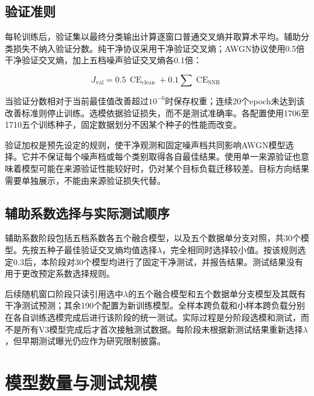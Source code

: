 \documentclass[UTF8,12pt,openany,twoside]{ctexbook}
\numberwithin{equation}{chapter}
\begin{document}
\subsection{验证准则}\label{ux9a8cux8bc1ux51c6ux5219}

每轮训练后，验证集以最终分类输出计算逐窗口普通交叉熵并取算术平均。辅助分类损失不纳入验证分数。纯干净协议采用干净验证交叉熵；AWGN协议使用0.5倍干净验证交叉熵，加上五档噪声验证交叉熵各0.1倍：

\begin{equation}
\label{eq:auto15}
J_{\mathrm{val}}=0.5\,\operatorname{CE}_{\mathrm{clean}}+0.1\sum\operatorname{CE}_{\mathrm{SNR}}
\end{equation}


当验证分数相对于当前最佳值改善超过$10^{-6}$时保存权重；连续20个epoch未达到该改善标准则停止训练。选模依据验证损失，而不是测试准确率。各配置使用1706至1710五个训练种子，固定数据划分不因某个种子的性能而改变。

验证加权是预先设定的规则，使干净观测和固定噪声档共同影响AWGN模型选择。它并不保证每个噪声档或每个类别取得各自最佳结果。使用单一来源验证也意味着模型可能在来源验证性能较好时，仍对某个目标负载迁移较差。目标方向结果需要单独展示，不能由来源验证损失代替。

\subsection{辅助系数选择与实际测试顺序}\label{ux8f85ux52a9ux7cfbux6570ux9009ux62e9ux4e0eux5b9eux9645ux6d4bux8bd5ux987aux5e8f}

辅助系数阶段包括五档系数各五个融合模型，以及五个数据单分支对照，共30个模型。先按五种子最佳验证交叉熵均值选择\ensuremath{\lambda}，完全相同时选择较小值。按该规则选定0.3后，本阶段对30个模型均进行了固定干净测试，并报告结果。测试结果没有用于更改预定系数选择规则。

后续随机窗口阶段只读引用选中\ensuremath{\lambda}的五个融合模型和五个数据单分支模型及其既有干净测试预测；其余190个配置为新训练模型。全样本跨负载和小样本跨负载分别在各自训练选模完成后进行该阶段的统一测试。实际过程是分阶段选模和测试，而不是所有V3模型完成后才首次接触测试数据。每阶段未根据新测试结果重新选择\ensuremath{\lambda}，但早期测试曝光仍应作为研究限制披露。

\section{模型数量与测试规模}\label{ux6a21ux578bux6570ux91cfux4e0eux6d4bux8bd5ux89c4ux6a21}
\end{document}
